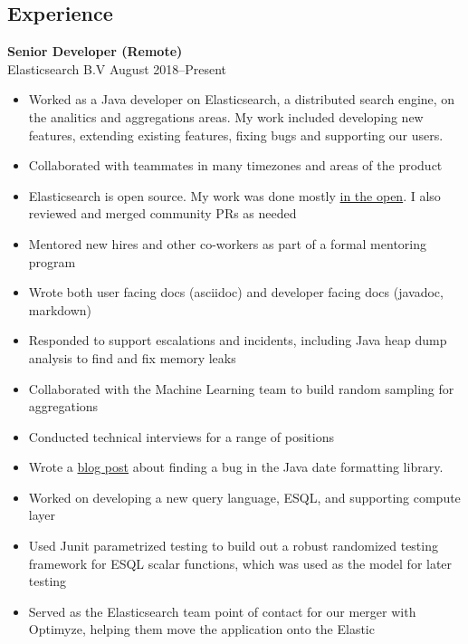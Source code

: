 \documentclass[margin]{res}
\begin{document}
\begin{resume}
\section{Experience}
{\bf Senior Developer (Remote)} \\
    Elasticsearch B.V \hfill August 2018--Present
    \begin{itemize}
        \item Worked as a Java developer on Elasticsearch, a distributed search
            engine, on the analitics and aggregations areas.  My work included
            developing new features, extending existing features, fixing bugs
            and supporting our users.
        \item Collaborated with teammates in many timezones and areas of the 
            product
        \item Elasticsearch is open source.  My work was done mostly
            \href{https://github.com/elastic/elasticsearch/pulls?q=is%3Apr+author%3Anot-napoleon+is%3Aclosed}{in
            the open}.  I also reviewed and merged community PRs as needed
        \item Mentored new hires and other co-workers as part of a formal 
            mentoring program
        \item Wrote both user facing docs (asciidoc) and developer facing docs
            (javadoc, markdown)
        \item Responded to support escalations and incidents, including Java 
            heap dump analysis to find and fix memory leaks
        \item Collaborated with the Machine Learning team to build random
            sampling for aggregations
        \item Conducted technical interviews for a range of positions
        \item Wrote a
            \href{https://www.elastic.co/blog/how-elastic-traced-a-formatting-bug-in-elasticsearch}{blog
            post} about finding a bug in the Java date formatting library.
        \item Worked on developing a new query language, ESQL, and supporting
            compute layer
        \item Used Junit parametrized testing to build out a robust randomized
            testing framework for ESQL scalar functions, which was used as the
            model for later testing
        \item Served as the Elasticsearch team point of contact for our merger
            with Optimyze, helping them move the application onto the Elastic

\end{itemize}
\end{resume}
\end{document}
